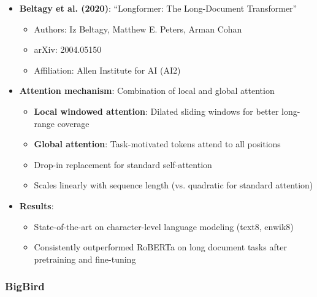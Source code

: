 \documentclass[11pt,letterpaper]{article}
\begin{document}
\begin{itemize}[leftmargin=*]
    \item \textbf{Beltagy et al. (2020)}: ``Longformer: The Long-Document Transformer''
    \begin{itemize}
        \item Authors: Iz Beltagy, Matthew E. Peters, Arman Cohan
        \item arXiv: 2004.05150
        \item Affiliation: Allen Institute for AI (AI2)
    \end{itemize}

    \item \textbf{Attention mechanism}: Combination of local and global attention
    \begin{itemize}
        \item \textbf{Local windowed attention}: Dilated sliding windows for better long-range coverage
        \item \textbf{Global attention}: Task-motivated tokens attend to all positions
        \item Drop-in replacement for standard self-attention
        \item Scales linearly with sequence length (vs. quadratic for standard attention)
    \end{itemize}

    \item \textbf{Results}:
    \begin{itemize}
        \item State-of-the-art on character-level language modeling (text8, enwik8)
        \item Consistently outperformed RoBERTa on long document tasks after pretraining and fine-tuning
    \end{itemize}
\end{itemize}

\subsubsection{BigBird}
\end{document}
